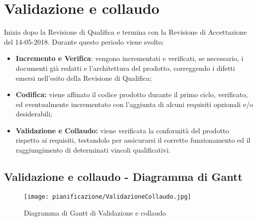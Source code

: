 \documentclass[../PianodiProgetto.tex]{subfiles}
\begin{document}
	\section{Validazione e collaudo}
	Inizia dopo la Revisione di Qualifica e termina con la Revisione di Accettazione del 14-05-2018. Durante questo periodo viene svolto:
	\begin{itemize}
		\item \textbf{Incremento e Verifica}: vengono incrementati e verificati, se necessario, i documenti già redatti e l'architettura del prodotto, correggendo i difetti emersi nell'esito della Revisione di Qualifica;
		\item \textbf{Codifica:} viene affinato il codice prodotto durante il primo ciclo, verificato, ed eventualmente incrementato con l'aggiunta di alcuni requisiti opzionali e/o desiderabili;		
		\item \textbf{Validazione e Collaudo:} viene verificata la conformità del prodotto rispetto ai requisiti, testandolo per assicurarsi il corretto funzionamento ed il raggiungimento di determinati vincoli qualificativi.
		 
	\end{itemize}
	\subsection{Validazione e collaudo - Diagramma di Gantt}
	\begin{figure}[H]
		\texttt{[image: pianificazione/ValidazioneCollaudo.jpg]}	
		\caption{Diagramma di Gantt di Validazione e collaudo}\label{fig:4}	
	\end{figure}
\end{document}
